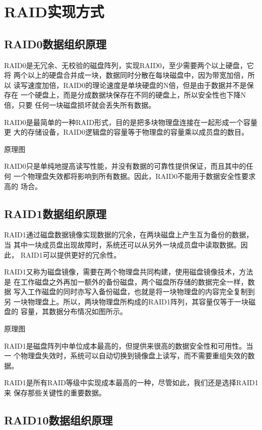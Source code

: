 \section{RAID实现方式}

\subsection{RAID0数据组织原理}

RAID0是无冗余、无校验的磁盘阵列，实现RAID0，至少需要两个以上硬盘，它将
两个以上的硬盘合并成一块，数据同时分散在每块磁盘中，因为带宽加倍，所以
读写速度加倍，RAID0的理论速度是单块硬盘的N倍，但是由于数据并不是保存在
一个硬盘上，而是分成数据块保存在不同的硬盘上，所以安全性也下降N倍，只要
任何一块磁盘损坏就会丢失所有数据。

RAID0是最简单的一种RAID形式，目的是把多块物理盘连接在一起形成一个容量更
大的存储设备，RAID0逻辑盘的容量等于物理盘的容量乘以成员盘的数目。

原理图

RAID0只是单纯地提高读写性能，并没有数据的可靠性提供保证，而且其中的任何
一个物理盘失效都将影响到所有数据。因此，RAID0不能用于数据安全性要求高的
场合。
\subsection{RAID1数据组织原理}

RAID1通过磁盘数据镜像实现数据的冗余，在两块磁盘上产生互为备份的数据，当
其中一块成员盘出现故障时，系统还可以从另外一块成员盘中读取数据。因此，
RAID1可以提供更好的冗余性。

RAID1又称为磁盘镜像，需要在两个物理盘共同构建，使用磁盘镜像技术，方法是
在工作磁盘之外再加一额外的备份磁盘，两个磁盘所存储的数据完全一样，数据
写入工作磁盘的同时亦写入备份磁盘，也就是将一块物理盘的内容完全复制到另
一块物理盘上。所以，两块物理盘所构成的RAID1阵列，其容量仅等于一块磁盘的
容量，其数据分布情况如图所示。

原理图

RAID1是磁盘阵列中单位成本最高的，但提供来很高的数据安全性和可用性。当一
个物理盘失效时，系统可以自动切换到镜像盘上读写，而不需要重组失效的数据。

RAID1是所有RAID等级中实现成本最高的一种，尽管如此，我们还是选择RAID1来
保存那些关键性的重要数据。

\subsection{RAID10数据组织原理}

